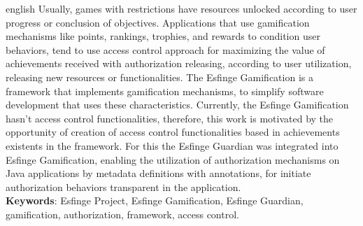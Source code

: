 \begin{resumo}[Abstract]
    \begin{otherlanguage*}{english}
        Usually, games with restrictions have resources unlocked according to user progress or conclusion of objectives. Applications that use gamification mechanisms like points, rankings, trophies, and rewards to condition user behaviors, tend to use access control approach for maximizing the value of achievements received with authorization releasing, according to user utilization, releasing new resources or functionalities. The Esfinge Gamification is a framework that implements gamification mechanisms, to simplify software development that uses these characteristics. Currently, the Esfinge Gamification hasn't access control functionalities, therefore, this work is motivated by the opportunity of creation of access control functionalities based in achievements existents in the framework. For this the Esfinge Guardian was integrated into Esfinge Gamification, enabling the utilization of authorization mechanisms on Java applications by metadata definitions with annotations, for initiate authorization behaviors transparent in the application.
	    \vspace{\onelineskip}
	    \noindent
	    \\
	    \textbf{Keywords}: Esfinge Project, Esfinge Gamification, Esfinge Guardian, gamification, authorization, framework, access control.
    \end{otherlanguage*}
\end{resumo}